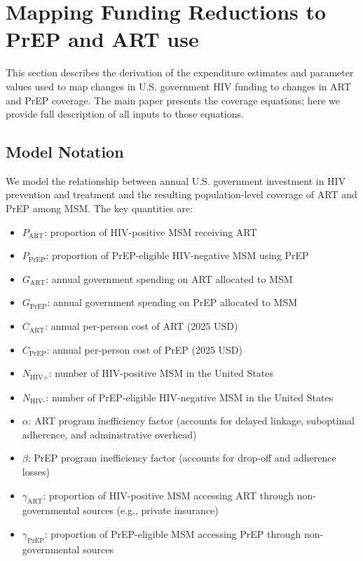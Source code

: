 \documentclass[preprint,12pt]{elsarticle}
\begin{document}
\clearpage
\section{Mapping Funding Reductions to PrEP and ART use}\label{sec:supp-expenditure-estimates}
{

This section describes the derivation of the expenditure estimates and parameter values used to map changes in U.S. government HIV funding to changes in ART and PrEP coverage. The main paper presents the coverage equations; here we provide full description  of all inputs to those equations.

\subsection{Model Notation}

We model the relationship between annual U.S. government investment in HIV prevention and treatment and the resulting population-level coverage of ART and PrEP among MSM. The key quantities are:

\begin{itemize}
    \item $P_{\text{ART}}$: proportion of HIV-positive MSM receiving ART
    \item $P_{\text{PrEP}}$: proportion of PrEP-eligible HIV-negative MSM using PrEP
    \item $G_{\text{ART}}$: annual government spending on ART allocated to MSM
    \item $G_{\text{PrEP}}$: annual government spending on PrEP allocated to MSM
    \item $C_{\text{ART}}$: annual per-person cost of ART (2025 USD)
    \item $C_{\text{PrEP}}$: annual per-person cost of PrEP (2025 USD)
    \item $N_{\text{HIV+}}$: number of HIV-positive MSM in the United States
    \item $N_{\text{HIV-}}$: number of PrEP-eligible HIV-negative MSM in the United States
    \item $\alpha$: ART program inefficiency factor (accounts for delayed linkage,
          suboptimal adherence, and administrative overhead)
    \item $\beta$: PrEP program inefficiency factor (accounts for drop-off and
          adherence losses)
    \item $\gamma_{\text{ART}}$: proportion of HIV-positive MSM accessing ART through
          non-governmental sources (e.g., private insurance)
    \item $\gamma_{\text{PrEP}}$: proportion of PrEP-eligible MSM accessing PrEP through
          non-governmental sources
\end{itemize}

}
\end{document}

